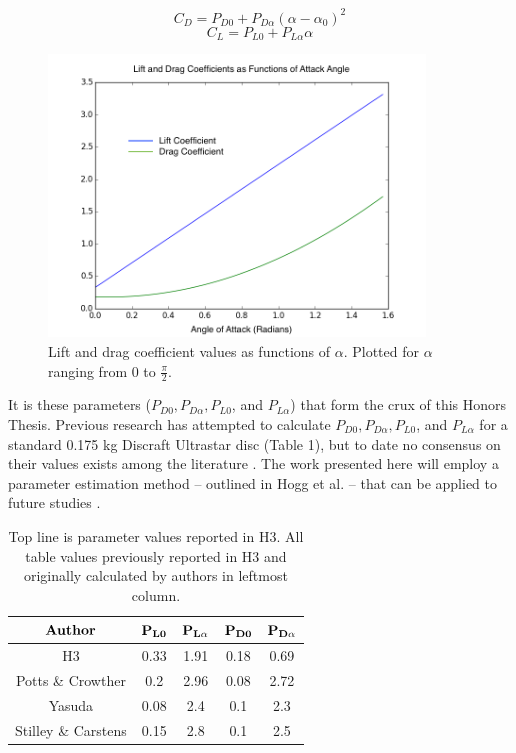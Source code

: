 \documentclass[a4paper,12pt, oneside]{article}
\begin{document}
\begin{equation}
  C_D=P_{D0}+P_{D\alpha}(\alpha-\alpha_0)^2
\end{equation}
\begin{equation}
  C_L=P_{L0}+P_{L\alpha}\alpha
\end{equation}
\begin{figure}[H]
	\centering
	\includegraphics[width=10cm, height=7.5cm]{liftanddrag}
	\caption{Lift and drag coefficient values as functions of $\alpha.$ Plotted for $\alpha$ ranging from 0 to $\frac{\pi}{2}$.}
\end{figure}
It is these parameters ($P_{D0}, P_{D\alpha}, P_{L0}$, and $P_{L\alpha}$) that form the crux of this Honors Thesis. Previous research has attempted to calculate $P_{D0}, P_{D\alpha}, P_{L0}$, and $P_{L\alpha}$ for a standard 0.175 kg Discraft Ultrastar disc (Table 1), but to date no consensus on their values exists among the literature \cite{H3, pottsandcrowther2007, yasuda, stilleyandcarstens}. The work presented here will employ a parameter estimation method -- outlined in Hogg et al. -- that can be applied to future studies \cite{hogg2010data}.

\begin{table}[h]\label{tab:1}
\centering
\begin{tabular}{| c | c | c | c | c |}
\hline
$\bf{Author}$ & $\bf{P_{L0}}$ & $\bf{P_{L\alpha}}$ & $\bf{P_{D0}}$ & $\bf{P_{D\alpha}}$ \\ \hline
H3 & 0.33 & 1.91 & 0.18 & 0.69  \\ \hline
Potts \& Crowther & 0.2 & 2.96 & 0.08 & 2.72 \\ \hline
Yasuda & 0.08 & 2.4 & 0.1 & 2.3 \\ \hline
Stilley \& Carstens & 0.15 & 2.8 & 0.1 & 2.5 \\ \hline
\end{tabular}
\caption{Top line is parameter values reported in H3. All table values previously reported in H3 and originally calculated by authors in leftmost column.}
\end{table} 
\end{document}
